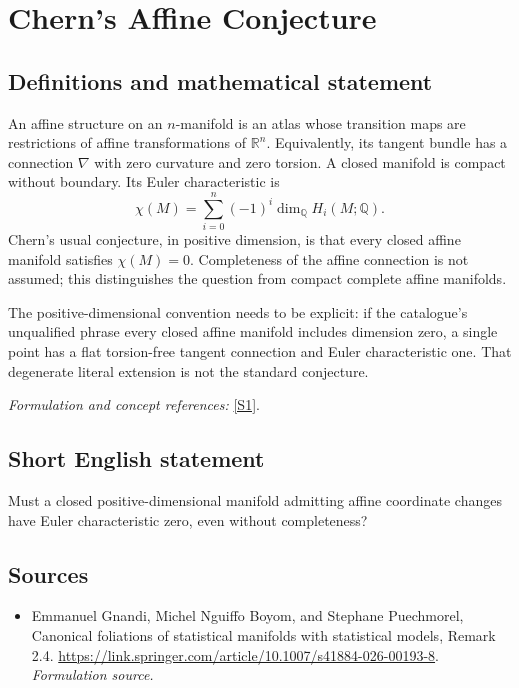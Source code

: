 \documentclass[11pt]{article}
\begin{document}
\section*{\texorpdfstring{Chern's Affine Conjecture}{Chern's Affine Conjecture}}\label{1206}
\subsection{Definitions and mathematical statement}
An affine structure on an $n$-manifold is an atlas whose transition maps are restrictions of affine transformations of ${\mathbb{R}}^n$. Equivalently, its tangent bundle has a connection $\nabla$ with zero curvature and zero torsion. A closed manifold is compact without boundary. Its Euler characteristic is
\[
 \chi(M)=\sum_{i=0}^n(-1)^i\dim_{{\mathbb{Q}}} H_i(M;{\mathbb{Q}}).
\]
Chern's usual conjecture, in positive dimension, is that every closed affine manifold satisfies $\chi(M)=0$. Completeness of the affine connection is not assumed; this distinguishes the question from compact complete affine manifolds.

The positive-dimensional convention needs to be explicit: if the catalogue's unqualified phrase every closed affine manifold includes dimension zero, a single point has a flat torsion-free tangent connection and Euler characteristic one. That degenerate literal extension is not the standard conjecture.
\par\smallskip\textit{Formulation and concept references:} \href{https://link.springer.com/article/10.1007/s41884-026-00193-8}{[S1]}.

\subsection{Short English statement}
Must a closed positive-dimensional manifold admitting affine coordinate changes have Euler characteristic zero, even without completeness?
\subsection{Sources}
\begin{itemize}
\item[S1]Emmanuel Gnandi, Michel Nguiffo Boyom, and Stephane Puechmorel, Canonical foliations of statistical manifolds with statistical models, Remark 2.4.
\url{https://link.springer.com/article/10.1007/s41884-026-00193-8}.
\textit{Formulation source.}
\end{itemize}
\end{document}

